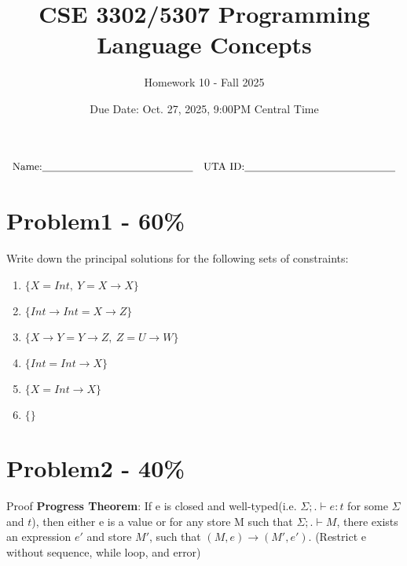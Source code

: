 \documentclass{article}
\newcommand{\answerboxbig}{
    \vspace{20cm} %
}
\newcommand{\studentinfo}{
    $$\begin{array}{cc}
        \noindent \text{Name:} \underline{\hspace{5cm}} &
            \text{UTA ID:} \underline{\hspace{5cm}}\\
    \end{array}$$
}
\begin{document}
\title{CSE 3302/5307 Programming Language Concepts}
\author{Homework 10 - Fall 2025}
\date{Due Date: Oct. 27, 2025, 9:00PM Central Time}
\maketitle
\thispagestyle{fancy}

\studentinfo


\section*{Problem1 - 60\%}

Write down the principal solutions for the following sets of constraints:

\begin{enumerate}
  \item $\{X = Int,\ Y = X\rightarrow X\}$
  \item $\{Int\rightarrow Int = X\rightarrow Z\}$
  \item $\{X\rightarrow Y = Y\rightarrow Z,\ Z = U\rightarrow W\}$
  \item $\{Int = Int\rightarrow X\}$
  \item $\{X = Int\rightarrow X\}$
  \item $\{\}$
\end{enumerate}

\answerboxbig

\section*{Problem2 - 40\%}

Proof \textbf{Progress Theorem}: If e is closed and well-typed(i.e. $\Sigma; . \vdash e:t$ for some $\Sigma$ and $t$), then either e is a value or for any store M such that $\Sigma; . \vdash M$, there exists an expression $e'$ and store $M'$, such that $(M, e)\rightarrow (M',e')$. (Restrict e without sequence, while loop, and error)

\answerboxbig

\newpage 
\mbox{}
\newpage 
\end{document}
